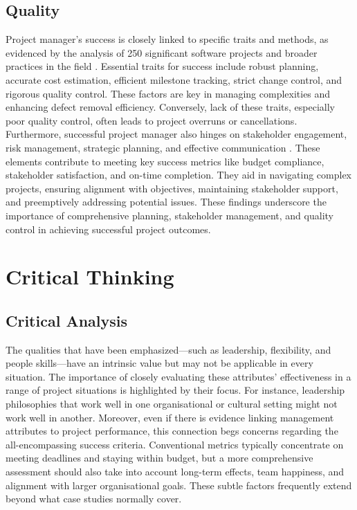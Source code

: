 \documentclass{article}
\begin{document}
\subsection{Quality}

Project manager's success is closely linked to specific traits and methods, as evidenced by the analysis of 250 significant software projects and broader practices in the field \cite{jones2004software}. Essential traits for success include robust planning, accurate cost estimation, efficient milestone tracking, strict change control, and rigorous quality control. These factors are key in managing complexities and enhancing defect removal efficiency. Conversely, lack of these traits, especially poor quality control, often leads to project overruns or cancellations. Furthermore, successful project manager also hinges on stakeholder engagement, risk management, strategic planning, and effective communication \cite{fernandes2013identifying}. These elements contribute to meeting key success metrics like budget compliance, stakeholder satisfaction, and on-time completion. They aid in navigating complex projects, ensuring alignment with objectives, maintaining stakeholder support, and preemptively addressing potential issues. These findings underscore the importance of comprehensive planning, stakeholder management, and quality control in achieving successful project outcomes.

\section{Critical Thinking}

\subsection{Critical Analysis}

The qualities that have been emphasized—such as leadership, flexibility, and people skills—have an intrinsic value but may not be applicable in every situation. The importance of closely evaluating these attributes' effectiveness in a range of project situations is highlighted by their focus. For instance, leadership philosophies that work well in one organisational or cultural setting might not work well in another. Moreover, even if there is evidence linking management attributes to project performance, this connection begs concerns regarding the all-encompassing success criteria. Conventional metrics typically concentrate on meeting deadlines and staying within budget, but a more comprehensive assessment should also take into account long-term effects, team happiness, and alignment with larger organisational goals. These subtle factors frequently extend beyond what case studies normally cover.
\end{document}
